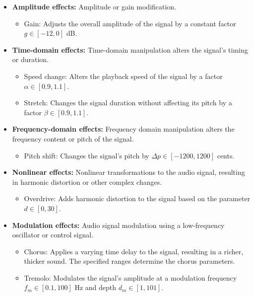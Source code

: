 \begin{itemize}
\item \textbf{Amplitude effects:} Amplitude or gain modification.
\begin{itemize}
    \item Gain: Adjusts the overall amplitude of the signal by a constant factor $g \in [-12, 0]$ dB.
\end{itemize}

\item \textbf{Time-domain effects:} Time-domain manipulation alters the signal's timing or duration.
\begin{itemize}
    \item Speed change: Alters the playback speed of the signal by a factor $\alpha \in [0.9, 1.1]$.
    \item Stretch: Changes the signal duration without affecting its pitch by a factor $\beta \in [0.9, 1.1]$.
\end{itemize}

\item \textbf{Frequency-domain effects:} Frequency domain manipulation alters the frequency content or pitch of the signal.
\begin{itemize}
    \item Pitch shift: Changes the signal's pitch by $\Delta p \in [-1200, 1200]$ cents.
\end{itemize}

\item \textbf{Nonlinear effects:} Nonlinear transformations to the audio signal, resulting in harmonic distortion or other complex changes.
\begin{itemize}
    \item Overdrive: Adds harmonic distortion to the signal based on the parameter $d \in [0, 30]$.
\end{itemize}

\item \textbf{Modulation effects:} Audio signal modulation using a low-frequency oscillator or control signal.
\begin{itemize}
    \item Chorus: Applies a varying time delay to the signal, resulting in a richer, thicker sound. The specified ranges determine the chorus parameters.
    \item Tremolo: Modulates the signal's amplitude at a modulation frequency $f_m \in [0.1, 100]$ Hz and depth $d_m \in [1, 101]$.
\end{itemize}


\end{itemize}
